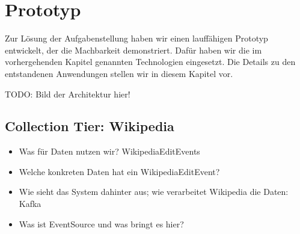 \section{Prototyp}
Zur Lösung der Aufgabenstellung haben wir einen lauffähigen Prototyp entwickelt, der die Machbarkeit demonstriert.
Dafür haben wir die im vorhergehenden Kapitel genannten Technologien eingesetzt. Die Details zu den entstandenen
Anwendungen stellen wir in diesem Kapitel vor.

TODO: Bild der Architektur hier!

\subsection{Collection Tier: Wikipedia}
\begin{itemize}
    \item Was für Daten nutzen wir? WikipediaEditEvents
    \item Welche konkreten Daten hat ein WikipediaEditEvent?
    \item Wie sieht das System dahinter aus; wie verarbeitet Wikipedia die Daten: Kafka
    \item Was ist EventSource und was bringt es hier?
\end{itemize}

